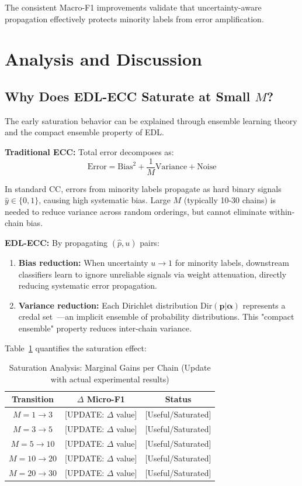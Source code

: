 \documentclass[conference]{IEEEtran}
\begin{document}
The consistent Macro-F1 improvements validate that uncertainty-aware propagation effectively protects minority labels from error amplification.

\section{Analysis and Discussion}

\subsection{Why Does EDL-ECC Saturate at Small $M$?}

The early saturation behavior can be explained through ensemble learning theory and the compact ensemble property of EDL.

\textbf{Traditional ECC:} Total error decomposes as:
\begin{equation}
\text{Error} = \text{Bias}^2 + \frac{1}{M}\text{Variance} + \text{Noise}
\end{equation}

In standard CC, errors from minority labels propagate as hard binary signals $\hat{y} \in \{0,1\}$, causing high systematic bias. Large $M$ (typically 10-30 chains) is needed to reduce variance across random orderings, but cannot eliminate within-chain bias.

\textbf{EDL-ECC:} By propagating $(\hat{p}, u)$ pairs:
\begin{enumerate}
    \item \textbf{Bias reduction:} When uncertainty $u \to 1$ for minority labels, downstream classifiers learn to ignore unreliable signals via weight attenuation, directly reducing systematic error propagation.
    \item \textbf{Variance reduction:} Each Dirichlet distribution $\text{Dir}(\mathbf{p}|\boldsymbol{\alpha})$ represents a credal set~\cite{josang2016subjective}—an implicit ensemble of probability distributions. This "compact ensemble" property reduces inter-chain variance.
\end{enumerate}

Table~\ref{tab:saturation_analysis} quantifies the saturation effect:

\begin{table}[t]
\centering
\caption{Saturation Analysis: Marginal Gains per Chain (Update with actual experimental results)}
\label{tab:saturation_analysis}
\small
\begin{tabular}{ccc}
\toprule
\textbf{Transition} & \textbf{$\Delta$ Micro-F1} & \textbf{Status} \\
\midrule
$M=1 \to 3$ & [UPDATE: $\Delta$ value] & [Useful/Saturated] \\
$M=3 \to 5$ & [UPDATE: $\Delta$ value] & [Useful/Saturated] \\
$M=5 \to 10$ & [UPDATE: $\Delta$ value] & [Useful/Saturated] \\
$M=10 \to 20$ & [UPDATE: $\Delta$ value] & [Useful/Saturated] \\
$M=20 \to 30$ & [UPDATE: $\Delta$ value] & [Useful/Saturated] \\
\bottomrule
\end{tabular}
\end{table}
\end{document}
